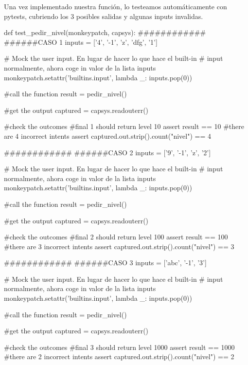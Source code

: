 Una vez implementado nuestra función, lo testeamos automáticamente con pytests, cubriendo los 3 posibles salidas y algunas inputs invalidas.

\begin{python}
def test_pedir_nivel(monkeypatch, capsys): 
    ############
    ######CASO 1
    inputs = ['4', '-1', 'z', 'dfg', '1'] 
    
    # Mock the user input. En lugar de hacer lo que hace el built-in
    # input normalmente, ahora coge in valor de la lista inputs
    monkeypatch.setattr('builtins.input', lambda _: inputs.pop(0))
    
    #call the function
    result = pedir_nivel()
    
    #get the output
    captured = capsys.readouterr()
    
    #check the outcomes
    #final 1 should return level 10
    assert result == 10
    #there are 4 incorrect intents
    assert captured.out.strip().count("nivel") == 4

    ############
    ######CASO 2
    inputs = ['9', '-1', 'z', '2'] 
    
    # Mock the user input. En lugar de hacer lo que hace el built-in
    # input normalmente, ahora coge in valor de la lista inputs
    monkeypatch.setattr('builtins.input', lambda _: inputs.pop(0))
    
    #call the function
    result = pedir_nivel()
    
    #get the output
    captured = capsys.readouterr()
    
    #check the outcomes
    #final 2 should return level 100
    assert result == 100
    #there are 3 incorrect intents
    assert captured.out.strip().count("nivel") == 3
    
    ############
    ######CASO 3
    inputs = ['abc', '-1', '3'] 
    
    # Mock the user input. En lugar de hacer lo que hace el built-in
    # input normalmente, ahora coge in valor de la lista inputs
    monkeypatch.setattr('builtins.input', lambda _: inputs.pop(0))
    
    #call the function
    result = pedir_nivel()
    
    #get the output
    captured = capsys.readouterr()
    
    #check the outcomes
    #final 3 should return level 1000
    assert result == 1000
    #there are 2 incorrect intents
    assert captured.out.strip().count("nivel") == 2
\end{python}

